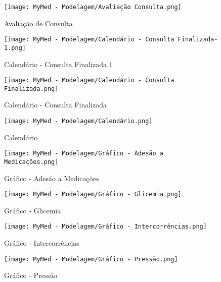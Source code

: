 \begin{figure}
	\centering
	\texttt{[image: MyMed - Modelagem/Avaliação Consulta.png]}
	\caption{Avaliação de Consulta}
	\label{avaliacao_consulta}
\end{figure}

\begin{figure}
	\centering
	\texttt{[image: MyMed - Modelagem/Calendário - Consulta Finalizada-1.png]}
	\caption{Calendário - Consulta Finalizada 1}
	\label{calendario_consulta_finalizada_1}
\end{figure}

\begin{figure}
	\centering
	\texttt{[image: MyMed - Modelagem/Calendário - Consulta Finalizada.png]}
	\caption{Calendário - Consulta Finalizada}
	\label{calendario_consulta_finalizada}
\end{figure}

\begin{figure}
	\centering
	\texttt{[image: MyMed - Modelagem/Calendário.png]}
	\caption{Calendário}
	\label{calendario}
\end{figure}

\begin{figure}
	\centering
	\texttt{[image: MyMed - Modelagem/Gráfico - Adesão a Medicações.png]}
	\caption{Gráfico - Adesão a Medicações}
	\label{grafico_adesao_medicacoes}
\end{figure}

\begin{figure}
	\centering
	\texttt{[image: MyMed - Modelagem/Gráfico - Glicemia.png]}
	\caption{Gráfico - Glicemia}
	\label{grafico_glicemia}
\end{figure}

\begin{figure}
	\centering
	\texttt{[image: MyMed - Modelagem/Gráfico - Intercorrências.png]}
	\caption{Gráfico - Intercorrências}
	\label{grafico_intercorrencias}
\end{figure}

\begin{figure}
	\centering
	\texttt{[image: MyMed - Modelagem/Gráfico - Pressão.png]}
	\caption{Gráfico - Pressão}
	\label{grafico_pressao}
\end{figure}

